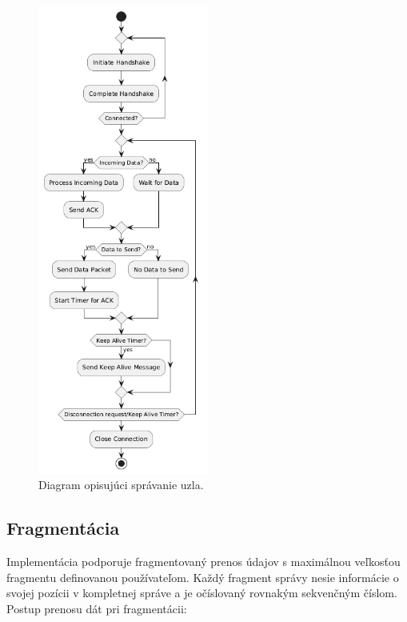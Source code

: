 \documentclass[a4paper,12pt]{article}
\begin{document}
   \begin{figure}[h]
        \centering
        \includegraphics[width=0.5\textwidth]{program_diagram.png}
        \caption{Diagram opisujúci správanie uzla.}
        \label{fig:workflow}
    \end{figure}



    \subsection{Fragmentácia}\label{frag}
    Implementácia podporuje fragmentovaný prenos údajov s maximálnou veľkosťou fragmentu definovanou používateľom. Každý fragment správy nesie informácie o svojej pozícii v kompletnej správe a je očíslovaný rovnakým sekvenčným číslom. Postup prenosu dát pri fragmentácii:
\end{document}
